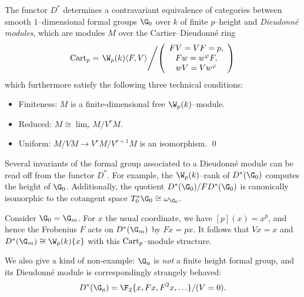 \begin{theorem}\label{MainContraDieudonneThm}
The functor $D^*$ determines a contravariant equivalence of categories between smooth $1$--dimensional formal groups $\G_0$ over $k$ of finite $p$--height and \textit{Dieudonn\'e modules}, which are modules $M$ over the Cartier--Dieudonn\'e ring \[\Cart_p = \left. \W_p(k)\<F,V\> \middle/ \left( \begin{array}{c} FV = VF = p, \\ Fw = w^\phi F, \\ wV = Vw^\phi \end{array} \right) \right.\] which furthermore satisfy the following three technical conditions:
\begin{itemize}
    \item Finiteness: $M$ is a finite-dimensional free $\W_p(k)$--module.
    \item Reduced: $M \cong \lim_r M / V^r M$.
    \item Uniform: $M/VM \to V^r M / V^{r+1} M$ is an isomorphism.
    \qed
\end{itemize}
\end{theorem}

\begin{remark}
Several invariants of the formal group associated to a Dieudonn\'e module can be read off from the functor $D^*$.  For example, the $\W_p(k)$--rank of $D^*(\G_0)$ computes the height of $\G_0$.  Additionally, the quotient $D^*(\G_0) / FD^*(\G_0)$ is canonically isomorphic to the cotangent space $T_0^* \G_0 \cong \omega_{\G_0}$.
\end{remark}

\begin{example}
Consider $\G_0 = \G_m$.  For $x$ the usual coordinate, we have $[p](x) = x^p$, and hence the Frobenius $F$ acts on $D^*(\G_m)$ by $Fx = px$.  It follows that $Vx = x$ and $D^*(\G_m) \cong \W_p(k)\{x\}$ with this $\mathrm{Cart}_p$--module structure.
\end{example}

\begin{example}
We also give a kind of non-example: $\G_a$ is \emph{not} a finite height formal group, and its Dieudonn\'e module is correspondingly strangely behaved: \[D^*(\G_a) = \F_2\{x, Fx, F^2x, \ldots\} / (V = 0).\]
\end{example}


